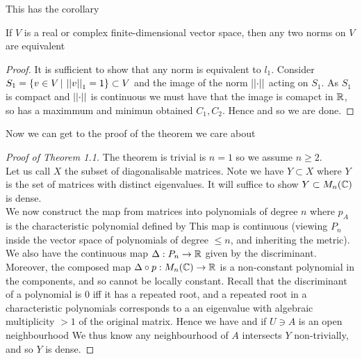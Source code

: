 \documentclass{article}
\begin{document}
This has the corollary

\begin{theorem}
	If $V$ is a real or complex finite-dimensional vector space, then any two norms on $V$ are equivalent 
\end{theorem}
\begin{proof}
It is sufficient to show that any norm is equivalent to $l_1$. Consider $S_1 = \left\{ v \in V \, | \, \left\lvert\left\lvert v \right\rvert\right\rvert_1=1 \right\}\subset V$ and the image of the norm $\left\lvert\left\lvert \cdot \right\rvert\right\rvert$ acting on $S_1$. As $S_1$ is compact and $\left\lvert\left\lvert \cdot \right\rvert\right\rvert$ is continuous we must have that the image is comapct in $\mathbb{R}$, so has a maximmum and minimun obtained $C_1, C_2$. Hence 
and so we are done. 
\end{proof}
Now we can get to the proof of the theorem we care about
\begin{proof}[Proof of Theorem 1.1]
	The theorem is trivial is $n=1$ so we assume $n\geq 2$. \\
	Let us call $X$ the subset of diagonalisable matrices. Note we have $Y\subset X$ where $Y$ is the set of matrices with distinct eigenvalues. It will suffice to show $Y \subset M_n(\mathbb{C})$ is dense. \\
	We now construct the map 
	 from matrices into polynomials of degree $n$ where $p_A$ is the characteristic polynomial defined by 
This map is continuous (viewing $P_n$ inside the vector space of polynomials of degree $\leq  n$, and inheriting the metric). We also have the continuous map $\Delta : P_n \to \mathbb{R}$ given by the discriminant. Moreover, the composed map $\Delta \circ p : M_n(\mathbb{C})\to \mathbb{R}$ is a non-constant polynomial in the components, and so cannot be locally constant. Recall that the discriminant of a polynomial is 0 iff it has a repeated root, and a repeated root in a characteristic polynomials corresponds to a an eigenvalue with algebraic multiplicity $>1$ of the original matrix. Hence we have 
and if $U\ni A$ is an open neighbourhood 
We thus know any neighbourhood of $A$ intersects $Y$ non-trivially, and so $Y$ is dense. 
\end{proof}
\end{document}
